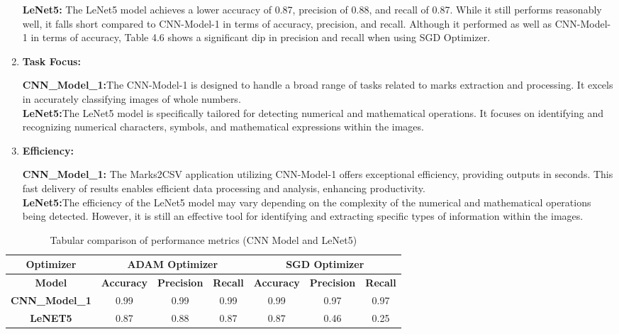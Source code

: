 \begin{enumerate}
\textbf{LeNet5:} The LeNet5 model achieves a lower accuracy of 0.87, precision of 0.88, and recall of 0.87. While it still performs reasonably well, it falls short compared to CNN-Model-1 in terms of accuracy, precision, and recall. Although it performed as well as CNN-Model-1 in terms of accuracy, Table 4.6 shows a significant dip in precision and recall when using SGD Optimizer.

\clearpage

\item \textbf{Task Focus:}

\textbf{CNN\_Model\_1:}The CNN-Model-1 is designed to handle a broad range of tasks related to marks extraction and processing. It excels in accurately classifying images of whole numbers.\\

\textbf{LeNet5:}The LeNet5 model is specifically tailored for detecting numerical and mathematical operations. It focuses on identifying and recognizing numerical characters, symbols, and mathematical expressions within the images.

\item \textbf{Efficiency:}

\textbf{CNN\_Model\_1:} The Marks2CSV application utilizing CNN-Model-1 offers exceptional efficiency, providing outputs in seconds. This fast delivery of results enables efficient data processing and analysis, enhancing productivity.\\

\textbf{LeNet5:}The efficiency of the LeNet5 model may vary depending on the complexity of the numerical and mathematical operations being detected. However, it is still an effective tool for identifying and extracting specific types of information within the images.

\end{enumerate}

\vspace{1 cm}

\begin{table}[h]
    \centering
    \caption{Tabular comparison of performance metrics (CNN Model and LeNet5)}
    \begin{tabular}{|c|c|c|c|c|c|c|}
    \hline
    \multicolumn{1}{|c|}{\textbf{Optimizer}} & \multicolumn{3}{c|}{\textbf{ADAM Optimizer}} & \multicolumn{3}{c|}{\textbf{SGD Optimizer}} \\ \hline
    \textbf{Model} & \textbf{Accuracy} & \textbf{Precision} & \textbf{Recall} & \textbf{Accuracy} & \textbf{Precision} & \textbf{\textbf{Recall}} \\ \hline
    \textbf{CNN\_Model\_1} & 0.99 & 0.99 & 0.99 & 0.99 & 0.97 & 0.97 \\ \hline
    \textbf{LeNET5} & 0.87 & 0.88 & 0.87 & 0.87 & 0.46 & 0.25 \\ \hline
    \end{tabular}
\end{table}

